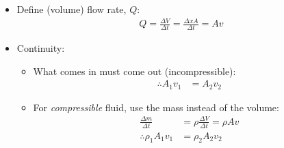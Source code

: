 \documentclass[aspectratio=169,
hyperref={colorlinks,urlcolor=blue}
]{beamer}
\begin{document}







{
\begin{itemize}
\item Define (volume) flow rate, $Q$:
\begin{align*}
Q=\frac{\Delta V}{\Delta t}=\frac{\Delta x A}{\Delta t}=Av
\end{align*}
\item Continuity:
\begin{itemize}
\item What comes in must come out (incompressible):
\begin{align*}
\therefore A_1 v_1 &= A_2 v_2
\end{align*}
\item For \textit{compressible} fluid, use the mass instead of the volume:
\begin{align*}
\frac{\Delta m}{\Delta t}&=\rho \frac{\Delta V}{\Delta t}=\rho Av\\
\therefore \rho_1 A_1 v_1 &=\rho_2 A_2 v_2
\end{align*}
\end{itemize}

\end{itemize}
}
\end{document}

